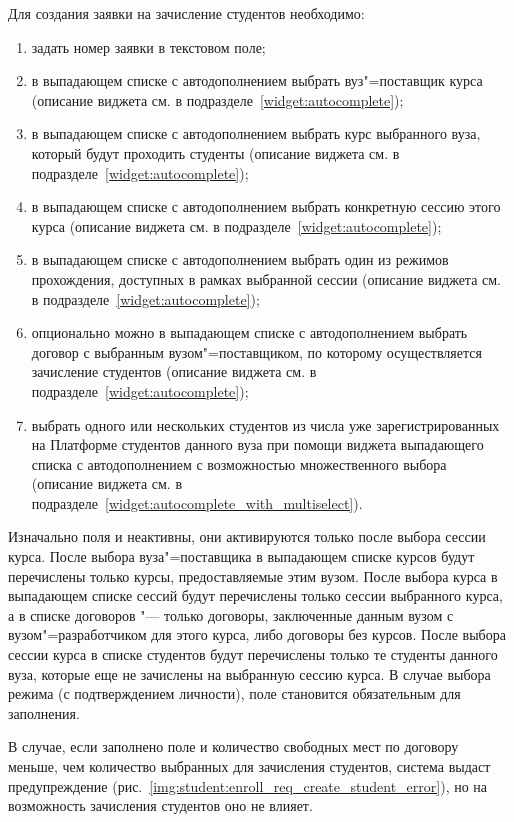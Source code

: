 Для создания заявки на зачисление студентов необходимо:
\begin{enumerate}
	\item задать номер заявки в текстовом поле;
	\item в выпадающем списке с автодополнением выбрать вуз"=поставщик курса
	(описание виджета см. в подразделе~\ref{widget:autocomplete});
	\item в выпадающем списке с автодополнением выбрать курс выбранного вуза, который будут проходить студенты 
	(описание виджета см. в подразделе~\ref{widget:autocomplete});
	\item в выпадающем списке с автодополнением выбрать конкретную сессию этого курса 
	(описание виджета см. в подразделе~\ref{widget:autocomplete});
	\item в выпадающем списке с автодополнением выбрать один из режимов прохождения, доступных в рамках выбранной сессии 
	(описание виджета см. в подразделе~\ref{widget:autocomplete});
	\item опционально можно в выпадающем списке с автодополнением выбрать договор с выбранным вузом"=поставщиком, 
	по которому осуществляется зачисление студентов (описание виджета см. в подразделе~\ref{widget:autocomplete});
	\item выбрать одного или нескольких студентов из числа уже зарегистрированных на Платформе студентов данного вуза 
	при помощи виджета выпадающего списка с автодополнением с возможностью множественного выбора 
	(описание виджета см. в подразделе~\ref{widget:autocomplete_with_multiselect}). 
\end{enumerate}


Изначально поля  и  неактивны, они активируются только после выбора сессии курса.
После выбора вуза"=поставщика в выпадающем списке курсов будут перечислены только курсы, предоставляемые этим вузом.
После выбора курса в выпадающем списке сессий будут перечислены только сессии выбранного курса, 
а в списке договоров "--- только договоры, заключенные данным вузом с вузом"=разработчиком для этого курса, 
либо договоры без курсов.
После выбора сессии курса в списке студентов будут перечислены только те студенты данного вуза,
которые еще не зачислены на выбранную сессию курса.
В случае выбора режима  (с подтверждением личности), поле  становится 
обязательным для заполнения. 

В случае, если заполнено поле  и количество свободных мест по договору меньше, 
чем количество выбранных для зачисления студентов, система выдаст предупреждение 
(рис.~\ref{img:student:enroll_req_create_student_error}), но на возможность зачисления студентов оно не влияет.

